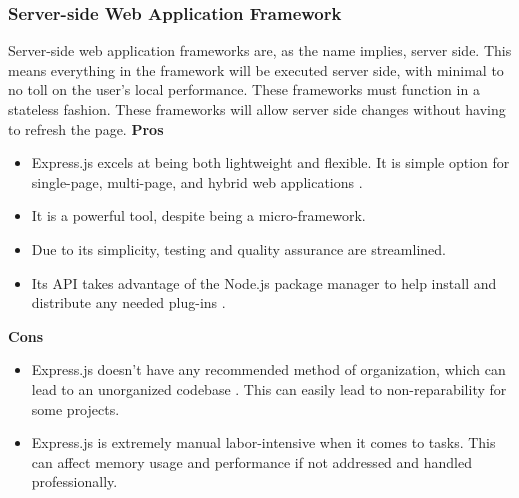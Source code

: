 \subsubsection{Server-side Web Application Framework}
Server-side web application frameworks are, as the name implies, server side. This means everything in the framework will be executed server side, with minimal to no toll on the user's local performance. These frameworks must function in a stateless fashion. These frameworks will allow server side changes without having to refresh the page.
			\textbf{Pros}
			\begin{itemize}
				\item Express.js excels at being both lightweight and flexible. It is simple option for single-page, multi-page, and hybrid web applications \cite{expressPC}. 
				\item It is a powerful tool, despite being a micro-framework. 
				\item Due to its simplicity, testing and quality assurance are streamlined. 
				\item Its API takes advantage of the Node.js package manager to help install and distribute any needed plug-ins \cite{expressPC}.
			\end{itemize}	
		\textbf{Cons}
			\begin{itemize}
				\item Express.js doesn't have any recommended method of organization, which can lead to an unorganized codebase \cite{expressPC}. This can easily lead to non-reparability for some projects. 
				\item Express.js is extremely manual labor-intensive when it comes to tasks. This can affect memory usage and performance if not addressed and handled professionally.
			\end{itemize}	
	

